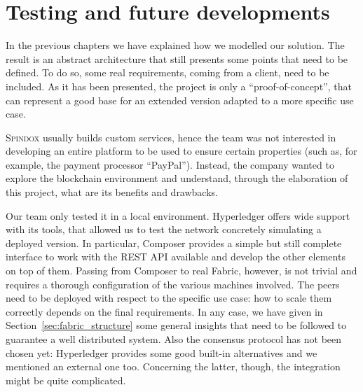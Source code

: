 \chapter{Testing and future developments}
\label{cha:future}

In the previous chapters we have explained how we modelled our solution. The result is an abstract architecture that still presents some points that need to be defined. To do so, some real requirements, coming from a client, need to be included. As it has been presented, the project is only a ``proof-of-concept'', that can represent a good base for an extended version adapted to a more specific use case.

\textsc{Spindox} usually builds custom services, hence the team was not interested in developing an entire platform to be used to ensure certain properties (such as, for example, the payment processor ``PayPal''). Instead, the company wanted to explore the blockchain environment and understand, through the elaboration of this project, what are its benefits and drawbacks. 

Our team only tested it in a local environment. Hyperledger offers wide support with its tools, that allowed us to test the network concretely simulating a deployed version. In particular, Composer provides a simple but still complete interface to work with the REST API available and develop the other elements on top of them. Passing from Composer to real Fabric, however, is not trivial and requires a thorough configuration of the various machines involved. The peers need to be deployed with respect to the specific use case: how to scale them correctly depends on the final requirements. In any case, we have given in Section~\ref{sec:fabric_structure} some general insights that need to be followed to guarantee a well distributed system. Also the consensus protocol has not been chosen yet: Hyperledger provides some good built-in alternatives and we mentioned an external one too. Concerning the latter, though, the integration might be quite complicated.

